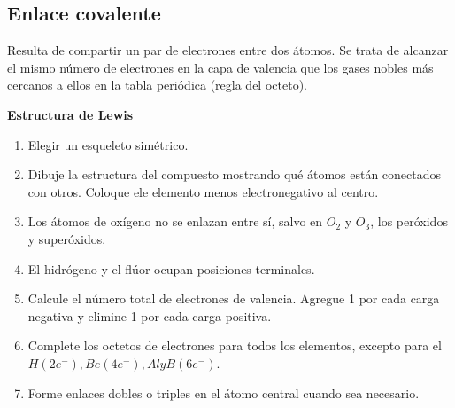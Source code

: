     \subsection{Enlace covalente}
        \sangria{} Resulta de compartir un par de electrones entre dos átomos. Se trata de alcanzar el mismo número de electrones en la capa de valencia que los gases nobles más cercanos a ellos en la tabla periódica (regla del octeto).
        \begin{center} \textbf{Estructura de Lewis} \end{center}
        \begin{enumerate} 
            \item Elegir un esqueleto simétrico.
            \item Dibuje la estructura del compuesto mostrando qué átomos están conectados con otros. Coloque ele elemento menos electronegativo al centro.
            \item Los átomos de oxígeno no se enlazan entre sí, salvo en $O_2$ y $O_3$, los peróxidos y superóxidos.
            \item El hidrógeno y el flúor ocupan posiciones terminales.
            \item Calcule el número total de electrones de valencia. Agregue 1 por cada carga negativa y elimine 1 por cada carga positiva.
            \item Complete los octetos de electrones para todos los elementos, excepto para el $H(2e^-), Be(4e^-), Al y B(6e^-)$.
            \item Forme enlaces dobles o triples en el átomo central cuando sea necesario.
        \end{enumerate}

